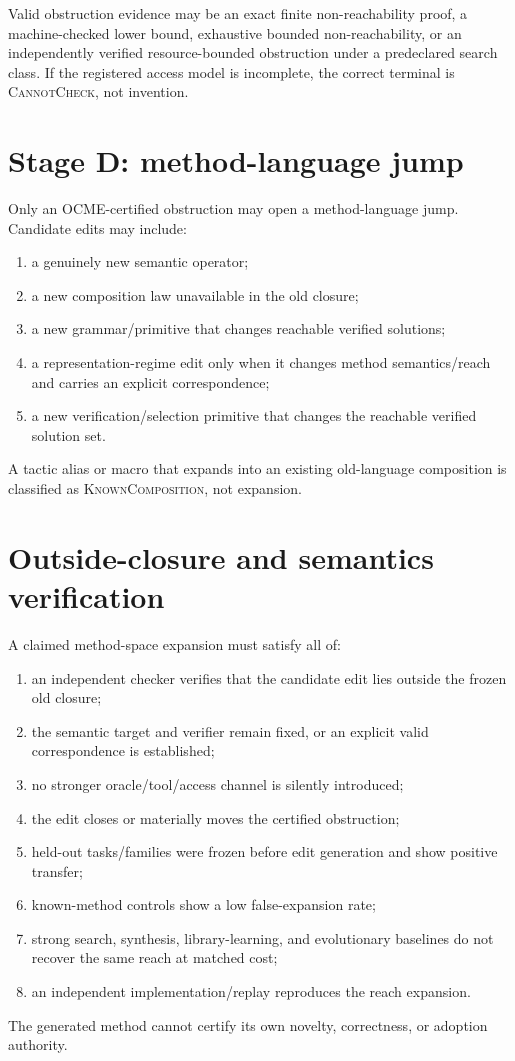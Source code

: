 \documentclass[11pt]{article}
\begin{document}
Valid obstruction evidence may be an exact finite non-reachability proof, a machine-checked lower bound, exhaustive bounded non-reachability, or an independently verified resource-bounded obstruction under a predeclared search class. If the registered access model is incomplete, the correct terminal is \textsc{CannotCheck}, not invention.

\section{Stage D: method-language jump}
Only an OCME-certified obstruction may open a method-language jump. Candidate edits may include:
\begin{enumerate}
    \item a genuinely new semantic operator;
    \item a new composition law unavailable in the old closure;
    \item a new grammar/primitive that changes reachable verified solutions;
    \item a representation-regime edit only when it changes method semantics/reach and carries an explicit correspondence;
    \item a new verification/selection primitive that changes the reachable verified solution set.
\end{enumerate}
A tactic alias or macro that expands into an existing old-language composition is classified as \textsc{KnownComposition}, not expansion.

\section{Outside-closure and semantics verification}
A claimed method-space expansion must satisfy all of:
\begin{enumerate}
    \item an independent checker verifies that the candidate edit lies outside the frozen old closure;
    \item the semantic target and verifier remain fixed, or an explicit valid correspondence is established;
    \item no stronger oracle/tool/access channel is silently introduced;
    \item the edit closes or materially moves the certified obstruction;
    \item held-out tasks/families were frozen before edit generation and show positive transfer;
    \item known-method controls show a low false-expansion rate;
    \item strong search, synthesis, library-learning, and evolutionary baselines do not recover the same reach at matched cost;
    \item an independent implementation/replay reproduces the reach expansion.
\end{enumerate}
The generated method cannot certify its own novelty, correctness, or adoption authority.
\end{document}
